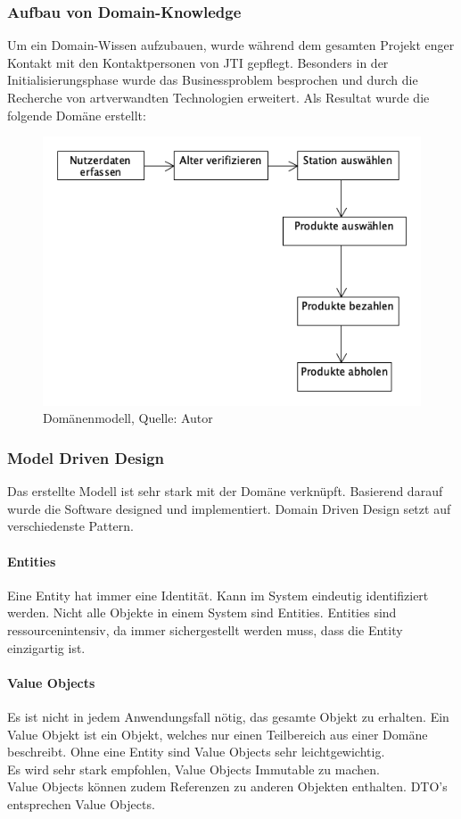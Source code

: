 \subsubsection{Aufbau von Domain-Knowledge}
Um ein Domain-Wissen aufzubauen, wurde während dem gesamten Projekt enger Kontakt mit den Kontaktpersonen von \ac{JTI} gepflegt. Besonders in der Initialisierungsphase wurde das Businessproblem besprochen und durch die Recherche von artverwandten Technologien erweitert. 
Als Resultat wurde die folgende Domäne erstellt: 
\begin{figure}[H]
	\centering
	\includegraphics[scale=0.5]{images/Domain.png}
	\caption[Domänenmodell]{Domänenmodell, Quelle: Autor}
	\label{img: domain}
\end{figure}

\subsubsection{Model Driven Design}
Das erstellte Modell ist sehr stark mit der Domäne verknüpft. Basierend darauf wurde die Software designed und implementiert. Domain Driven Design setzt auf verschiedenste Pattern.  
\paragraph{Entities}\label{entity}
Eine Entity hat immer eine Identität. Kann im System eindeutig identifiziert werden. Nicht alle Objekte in einem System sind Entities. Entities sind ressourcenintensiv, da immer sichergestellt werden muss, dass die Entity einzigartig ist.
\paragraph{Value Objects}
Es ist nicht in jedem Anwendungsfall nötig, das gesamte Objekt zu erhalten. Ein Value Objekt ist ein Objekt, welches nur einen Teilbereich aus einer Domäne beschreibt. Ohne eine Entity sind Value Objects sehr leichtgewichtig. \\
Es wird sehr stark empfohlen, Value Objects Immutable zu machen. \\
Value Objects können zudem Referenzen zu anderen Objekten enthalten. \ac{DTO}'s entsprechen Value Objects. 

